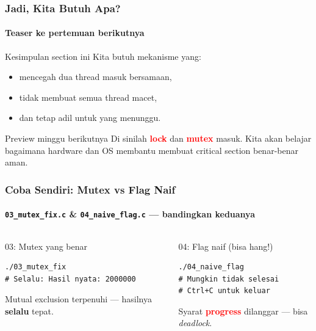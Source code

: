 \documentclass[t,aspectratio=169,xcolor=dvipsnames]{beamer}
\newcommand{\tem}[1]{\textbf{\textcolor{red}{#1}}}
\begin{document}
\begin{frame}
    \frametitle{Jadi, Kita Butuh Apa?}
    \framesubtitle{Teaser ke pertemuan berikutnya}
    \small

    \begin{block}{Kesimpulan section ini}
        Kita butuh mekanisme yang:
        \begin{itemize}
            \item mencegah dua thread masuk bersamaan,
            \item tidak membuat semua thread macet,
            \item dan tetap adil untuk yang menunggu.
        \end{itemize}
    \end{block}

    \vspace{0.2cm}
    \begin{exampleblock}{Preview minggu berikutnya}
        Di sinilah \tem{lock} dan \tem{mutex} masuk. Kita akan belajar bagaimana hardware dan OS membantu membuat critical section benar-benar aman.
    \end{exampleblock}
\end{frame}

\begin{frame}[fragile]
    \frametitle{Coba Sendiri: Mutex vs Flag Naif}
    \framesubtitle{\texttt{03\_mutex\_fix.c} \& \texttt{04\_naive\_flag.c} — bandingkan keduanya}
    \small

    \begin{columns}[T]
        \begin{exampleblock}{03: Mutex yang benar}
            \begin{lstlisting}[basicstyle=\ttfamily\scriptsize]
./03_mutex_fix
# Selalu: Hasil nyata: 2000000
            \end{lstlisting}
            Mutual exclusion terpenuhi — hasilnya \textbf{selalu} tepat.
        \end{exampleblock}

        \begin{alertblock}{04: Flag naif (bisa hang!)}
            \begin{lstlisting}[basicstyle=\ttfamily\scriptsize]
./04_naive_flag
# Mungkin tidak selesai
# Ctrl+C untuk keluar
            \end{lstlisting}
            Syarat \tem{progress} dilanggar — bisa \textit{deadlock}.
        \end{alertblock}
    \end{columns}
\end{frame}
\end{document}
